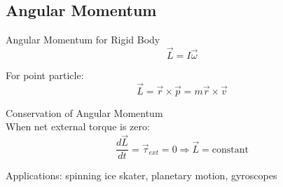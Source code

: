 \subsection{Angular Momentum}

\begin{definition}{Angular Momentum for Rigid Body}\\
    $$\vec{L} = I\vec{\omega}$$
    
    For point particle:
    $$\vec{L} = \vec{r} \times \vec{p} = m\vec{r} \times \vec{v}$$
\end{definition}

\begin{concept}{Conservation of Angular Momentum}\\
    When net external torque is zero:
    $$\frac{d\vec{L}}{dt} = \vec{\tau}_{ext} = 0 \Rightarrow \vec{L} = \text{constant}$$
    
    Applications: spinning ice skater, planetary motion, gyroscopes
\end{concept}

